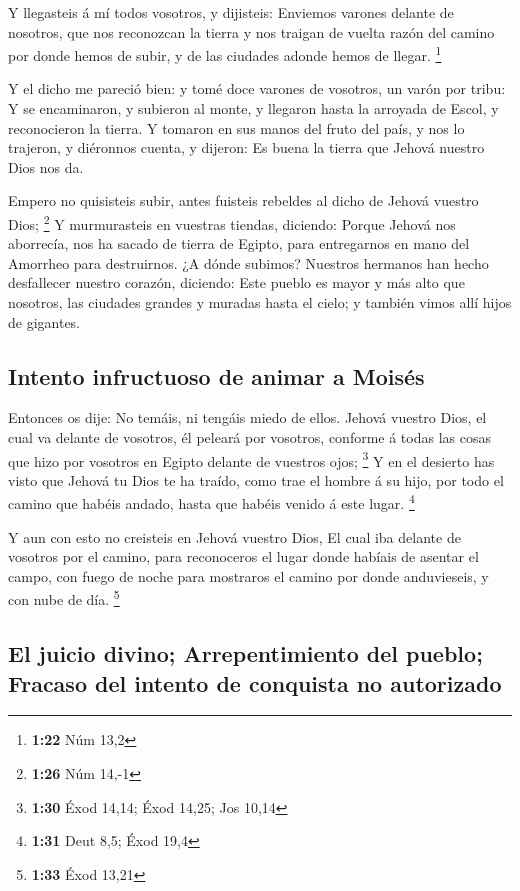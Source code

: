  Y llegasteis á mí todos vosotros, y dijisteis: Enviemos
varones delante de nosotros, que nos reconozcan la tierra y nos traigan
de vuelta razón del camino por donde hemos de subir, y de las ciudades
adonde hemos de llegar. \footnote{\textbf{1:22} Núm 13,2}

 Y el dicho me pareció bien: y tomé doce varones de
vosotros, un varón por tribu:  Y se encaminaron, y subieron
al monte, y llegaron hasta la arroyada de Escol, y reconocieron la
tierra.  Y tomaron en sus manos del fruto del país, y nos
lo trajeron, y diéronnos cuenta, y dijeron: Es buena la tierra que
Jehová nuestro Dios nos da.

 Empero no quisisteis subir, antes fuisteis rebeldes al
dicho de Jehová vuestro Dios; \footnote{\textbf{1:26} Núm 14,-1}
 Y murmurasteis en vuestras tiendas, diciendo: Porque
Jehová nos aborrecía, nos ha sacado de tierra de Egipto, para
entregarnos en mano del Amorrheo para destruirnos.  ¿A
dónde subimos? Nuestros hermanos han hecho desfallecer nuestro corazón,
diciendo: Este pueblo es mayor y más alto que nosotros, las ciudades
grandes y muradas hasta el cielo; y también vimos allí hijos de
gigantes.

\hypertarget{intento-infructuoso-de-animar-a-moisuxe9s}{%
\subsection{Intento infructuoso de animar a
Moisés}\label{intento-infructuoso-de-animar-a-moisuxe9s}}

 Entonces os dije: No temáis, ni tengáis miedo de ellos.
 Jehová vuestro Dios, el cual va delante de vosotros, él
peleará por vosotros, conforme á todas las cosas que hizo por vosotros
en Egipto delante de vuestros ojos; \footnote{\textbf{1:30} Éxod 14,14;
  Éxod 14,25; Jos 10,14}  Y en el desierto has visto que
Jehová tu Dios te ha traído, como trae el hombre á su hijo, por todo el
camino que habéis andado, hasta que habéis venido á este lugar.
\footnote{\textbf{1:31} Deut 8,5; Éxod 19,4}

 Y aun con esto no creisteis en Jehová vuestro Dios,
 El cual iba delante de vosotros por el camino, para
reconoceros el lugar donde habíais de asentar el campo, con fuego de
noche para mostraros el camino por donde anduvieseis, y con nube de día.
\footnote{\textbf{1:33} Éxod 13,21}

\hypertarget{el-juicio-divino-arrepentimiento-del-pueblo-fracaso-del-intento-de-conquista-no-autorizado}{%
\subsection{El juicio divino; Arrepentimiento del pueblo; Fracaso del
intento de conquista no
autorizado}\label{el-juicio-divino-arrepentimiento-del-pueblo-fracaso-del-intento-de-conquista-no-autorizado}}

